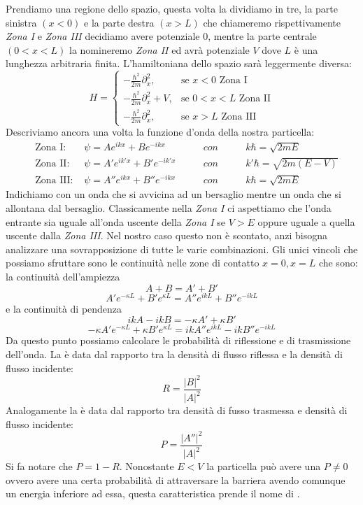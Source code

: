 Prendiamo una regione dello spazio, questa volta la dividiamo in tre, la parte sinistra $(x < 0)$ e la parte destra $(x > L)$ che chiameremo rispettivamente \textit{Zona I} e \textit{Zona III} decidiamo avere potenziale $0$, mentre la parte centrale $(0 < x < L)$ la nomineremo \textit{Zona II} ed avrà potenziale $V$ dove $L$ è una lunghezza arbitraria finita. L'hamiltoniana dello spazio sarà leggermente diversa:
$$H=\begin{cases}
 - \frac{\hbar^2}{2m} \partial_x^2, & \mbox{se } x<0 \mbox{ Zona I} \\
 - \frac{\hbar^2}{2m} \partial_x^2 + V, & \mbox{se } 0<x<L \mbox{ Zona II} \\
 - \frac{\hbar^2}{2m} \partial_x^2, & \mbox{se } x>L \mbox{ Zona III}
\end{cases}$$
Descriviamo ancora una volta la funzione d'onda della nostra particella:
\begin{equation}
\begin{aligned}
  \quad \mbox{Zona I: }   &\psi = Ae^{ikx} + Be^{-ikx} \qquad     & con \qquad & k\hbar = \sqrt{2mE}\\
  \quad \mbox{Zona II: }  &\psi = A'e^{ik'x} + B'e^{-ik'x} \qquad & con \qquad & k'\hbar = \sqrt{2m(E-V)}\\
  \quad \mbox{Zona III: } &\psi = A''e^{ikx} + B''e^{-ikx} \qquad & con \qquad & k\hbar = \sqrt{2mE}
\end{aligned}
\end{equation}
Indichiamo con  un onda che si avvicina ad un bersaglio mentre  un onda che si allontana dal bersaglio. Classicamente nella \textit{Zona I} ci aspettiamo che l'onda entrante sia uguale all'onda uscente della \textit{Zona I} se $V > E$ oppure uguale a quella uscente dalla \textit{Zona III}. Nel nostro caso questo non è scontato, anzi bisogna analizzare una sovrapposizione di tutte le varie combinazioni. Gli unici vincoli che possiamo sfruttare sono le continuità nelle zone di contatto $ x = 0, x = L$ che sono: la continuità dell'ampiezza
$$A + B = A' + B'$$
$$A'e^{-\kappa L} + B'e^{\kappa L} = A''e^{ikL} + B''e^{-ikL}$$
e la continuità di pendenza
$$ikA - ikB = -\kappa A' + \kappa B'$$
$$-\kappa A'e^{-\kappa L} + \kappa B'e^{\kappa L} = ikA''e^{ikL} - ikB''e^{-ikL}$$
Da questo punto possiamo calcolare le probabilità di riflessione e di trasmissione dell'onda.
La  è data dal rapporto tra la densità di flusso riflessa e la densità di flusso incidente:
$$R = \frac{|B|^2}{|A|^2}$$
Analogamente la  è data dal rapporto tra densità di fusso trasmessa e densità di flusso incidente:
$$P = \frac{|A''|^2}{|A|^2}$$
Si fa notare che $P = 1 - R$. Nonostante $E < V$ la particella può avere una $P \ne 0$ ovvero avere una certa probabilità di attraversare la barriera avendo comunque un energia inferiore ad essa, questa caratteristica prende il nome di .


